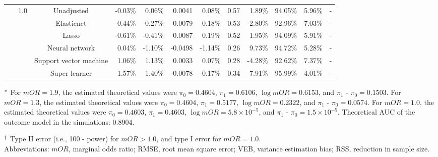 \documentclass{article}
\begin{document}
\begin{center}
\begin{table}[!ht]
\begin{tabular*}{\textwidth}{@{\extracolsep\fill}c|c|c|rrrr|rrrrr}
        ~ & \multirow{6}{*}{1.0} & Unadjusted & -0.03\% & 0.06\% & 0.0041 & 0.08\% & 0.57 & 1.89\% & 94.05\% & 5.96\% & \multicolumn{1}{c}{-} \\ 
        ~ & ~ & Elasticnet & -0.44\% & -0.27\% & 0.0079 & 0.18\% & 0.53 & -2.80\% & 92.96\% & 7.03\% & \multicolumn{1}{c}{-} \\ 
        ~ & ~ & Lasso & -0.61\% & -0.41\% & 0.0087 & 0.19\% & 0.52 & 1.95\% & 94.09\% & 5.91\% & \multicolumn{1}{c}{-} \\ 
        ~ & ~ & Neural network & 0.04\% & -1.10\% & -0.0498 & -1.14\% & 0.26 & 9.73\% & 94.72\% & 5.28\% & \multicolumn{1}{c}{-} \\ 
        ~ & ~ & Support vector machine & 1.06\% & 1.13\% & 0.0033 & 0.07\% & 0.28 & -4.28\% & 92.62\% & 7.37\% & \multicolumn{1}{c}{-} \\ 
        ~ & ~ & Super learner & 1.57\% & 1.40\% & -0.0078 & -0.17\% & 0.34 & 7.91\% & 95.99\% & 4.01\% & \multicolumn{1}{c}{-} \\  
\bottomrule
\end{tabular*}
\begin{tablenotes}
\item[$^{\rm *}$] For $mOR=1.9$, the estimated theoretical values were $\pi_0 = 0.4604$,  $\pi_1 = 0.6106$,  $\log mOR = 0.6153$,  and $\pi_1$ - $\pi_0 = 0.1503$.  For $mOR=1.3$,  the estimated theoretical values were $\pi_0 = 0.4604$,  $\pi_1 = 0.5177$,  $\log mOR = 0.2322$,  and $\pi_1$ - $\pi_0 = 0.0574$. For $mOR=1.0$, the estimated theoretical values were $\pi_0 = 0.4603$,  $\pi_1 = 0.4603$, $\log mOR = 5.8\times 10^{-5}$,  and  $\pi_1$ - $\pi_0 = 1.5\times 10^{-5}$. Theoretical AUC of the outcome model in the simulations: 0.8904.
\item[$^{\rm \dagger}$]Type II error (i.e., 100 - power) for $mOR>1.0$, and type I error for $mOR=1.0$.\\
Abbreviations:  $mOR$, marginal odds ratio; RMSE, root mean square error; VEB, variance estimation bias; RSS,  reduction in sample size.
\end{tablenotes}
\end{table}
\end{center}
\end{document}
